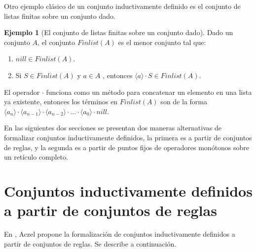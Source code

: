 \documentclass[11pt,oneside]{report}
\theoremstyle{plain}
\theoremstyle{definition}
\newtheorem{ejemplo}{Ejemplo}[chapter]
\begin{document}
Otro ejemplo clásico de un conjunto inductivamente definido es el conjunto de listas finitas sobre un conjunto dado.
\begin{ejemplo}[El conjunto de listas finitas sobre un conjunto dado]
    Dado un conjunto $A$, el conjunto $Finlist(A)$ es el menor conjunto tal que:
    \begin{enumerate}
        \item $nill \in Finlist(A)$.
        \item Si $S \in Finlist(A)$ y $a \in A$ , entonces $\langle a \rangle\cdot S\in Finlist(A)$.
    \end{enumerate}
    El operador $\cdot$ funciona como un método para concatenar un elemento en una lista ya existente, entonces los términos en $Finlist(A)$ son de la forma $\langle a_n\rangle \cdot\langle a_{n-1} \rangle\cdot\langle a_{n-2}\rangle\cdot\ldots\cdot\langle a_{0}\rangle\cdot nill$.
\end{ejemplo}

En las siguientes dos secciones se presentan dos maneras alternativas de formalizar conjuntos inductivamente definidos, la primera es a partir de conjuntos de reglas, y la segunda es a partir de puntos fijos de operadores monótonos sobre un retículo completo.

\section{Conjuntos inductivamente definidos a partir de conjuntos de reglas}

En \cite{Aczel}, Aczel propone la formalización de conjuntos inductivamente definidos a partir de conjuntos de reglas. Se describe a continuación.
\end{document}

